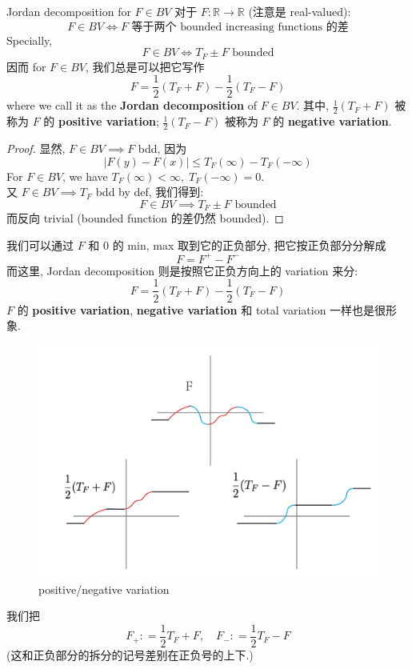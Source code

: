 \documentclass[lang=cn,11pt]{elegantbook}
\begin{document}
\begin{theorem}{Jordan decomposition for $ F \in BV $}
  对于 $F: \mathbb{R}\to \mathbb{R}$ (注意是 real-valued): \[
  F \in BV \iff F \text{ 等于两个 bounded increasing functions 的差}
  \]  Specially, \[
    F \in BV \iff  T_F \pm F \text{ bounded}
  \]
  因而 for $F\in BV$, 我们总是可以把它写作 \[
  F = \frac{1}{2}(T_F+F) - \frac{1}{2}(T_F-F)
  \]
  where we call it as the\textbf{ Jordan decomposition} of $F\in BV$. 其中,  $ \frac{1}{2}(T_F+F)$ 被称为 $F$ 的 \textbf{positive variation}; $ \frac{1}{2}(T_F-F)$ 被称为 $F$ 的 \textbf{negative variation}.
\end{theorem}
\begin{proof}
    显然, $F\in BV \implies F$ bdd, 因为\[
    |F(y) - F(x) | \leq T_F(\infty) - T_F(-\infty)
    \]
    For $F\in BV$, we have $T_F(\infty) < \infty , \; T_F(-\infty)  = 0$.\\
    又 $F\in BV \implies T_F$ bdd by def, 我们得到: \[
        F \in BV \implies  T_F \pm F \text{ bounded}
    \]而反向 trivial (bounded function 的差仍然 bounded).
\end{proof}
\begin{remark}
我们可以通过 $F$ 和 $0$ 的 min, max 取到它的正负部分, 把它按正负部分分解成 \[
F = F^+ - F^-
\]
而这里, Jordan decomposition 则是按照它正负方向上的 variation 来分: \[
  F = \frac{1}{2}(T_F+F) - \frac{1}{2}(T_F-F)
\]
$F$ 的 \textbf{positive variation}, \textbf{negative variation} 和 total variation 一样也是很形象.
\begin{figure}
    \centering
    \includegraphics[width=0.5\linewidth]{lec-notes/ch3-pics.assets/Screenshot 2025-04-19 at 02.30.17.png}
    \caption{positive/negative variation} 
    \label{fig:positive/negative variation}
\end{figure}
我们把 \[
F_+ : = \frac{1}{2}T_F + F,\quad F_- : = \frac{1}{2} T_F - F
\]
(这和正负部分的拆分的记号差别在正负号的上下.)
\end{remark}
\end{document}
